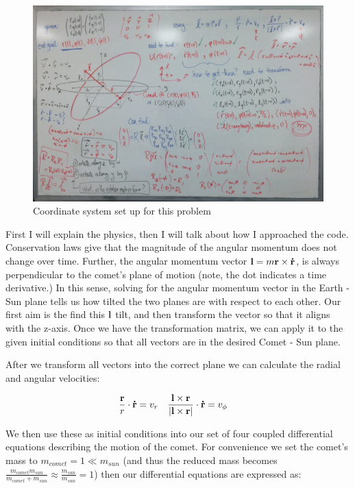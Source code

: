 \documentclass[11pt]{amsart}
\begin{document}
\begin{figure}[ht!]
\centering
\includegraphics[width=150mm]{fig2.jpg}
\caption{Coordinate system set up for this problem}
\label{overflow}
\end{figure}

First I will explain the physics, then I will talk about how I approached the code.  Conservation laws give that the magnitude of the angular momentum does not change over time.  Further, the angular momentum vector $\bold l = m \bold r \times \bold{\dot r}$, is always perpendicular to the comet's plane of motion (note, the dot indicates a time derivative.)  In this sense, solving for the angular momentum vector in the Earth - Sun plane tells us how tilted the two planes are with respect to each other.  Our first aim is the find this $\bold l$ tilt, and then transform the vector so that it aligns with the z-axis.  Once we have the transformation matrix, we can apply it to the given initial conditions so that all vectors are in the desired Comet - Sun plane.
\newline

After we transform all vectors into the correct plane we can calculate the radial and angular velocities:

\begin{align}
  \frac{\bold r}{r} \cdot \bold{\dot r} &= v_r & \frac{\bold l \times \bold r}{| \bold l \times \bold r |} \cdot \bold{\dot r} &= v_\phi
\end{align}
\vspace{2 mm}

We then use these as initial conditions into our set of four coupled differential equations describing the motion of the comet.  For convenience we set the comet's mass to $m_{comet}=1 \ll m_{sun}$ (and thus the reduced mass becomes $\frac{m_{comet} m_{sun}} {m_{comet} + m_{sun}} \approx \frac{m_{sun}} { m_{sun}} = 1$) then our differential equations are expressed as:
\end{document}
